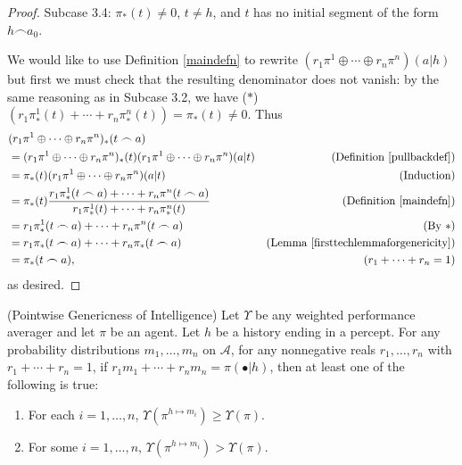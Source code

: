 \documentclass[runningheads]{llncs}
\begin{document}
\begin{proof}
    Subcase 3.4: $\pi_*(t)\not=0$, $t\not=h$, and $t$ has no initial segment
        of the form $h\frown a_0$.

    We would like to use Definition \ref{maindefn} to rewrite
    $(r_1\pi^1\oplus\cdots\oplus r_n\pi^n)(a|h)$ but first we must
    check that the resulting denominator does not vanish:
    by the same reasoning as in Subcase 3.2, we have
    ($*$) $(r_1\pi^1_*(t)+\cdots+r_n\pi^n_*(t))=\pi_*(t)\not=0$.
    Thus
    \begin{align*}
        &{} (r_1\pi^1\oplus\cdots\oplus r_n\pi^n)_*(t\frown a)\\
            &= (r_1\pi^1\oplus\cdots\oplus r_n\pi^n)_*(t)
                (r_1\pi^1\oplus\cdots\oplus r_n\pi^n)(a|t)
                    &\mbox{(Definition \ref{pullbackdef})}\\
            &= \pi_*(t)(r_1\pi^1\oplus\cdots\oplus r_n\pi^n)(a|t)
                    &\mbox{(Induction)}\\
            &= \pi_*(t)\frac{r_1\pi^1_*(t\frown a)+\cdots+r_n\pi^n(t\frown a)}
                {r_1\pi^1_*(t)+\cdots+r_n\pi^n_*(t)}
                    &\mbox{(Definition \ref{maindefn})}\\
            &= r_1\pi^1_*(t\frown a)+\cdots+r_n\pi^n(t\frown a)
                    &\mbox{(By $*$)}\\
            &= r_1\pi_*(t\frown a)+\cdots+r_n\pi_*(t\frown a)
                    &\mbox{(Lemma \ref{firsttechlemmaforgenericity})}\\
            &= \pi_*(t\frown a),
                    &\mbox{($r_1+\cdots+r_n=1$)}
    \end{align*}
    as desired.
\end{proof}

\begin{theorem}
    (Pointwise Genericness of Intelligence)
    Let $\Upsilon$ be any weighted performance averager and let
    $\pi$ be an agent.
    Let $h$ be a history ending in a percept.
    For any probability distributions $m_1,\ldots,m_n$ on $\mathcal A$,
    for any nonnegative reals $r_1,\ldots,r_n$ with $r_1+\cdots+r_n=1$,
    if $r_1m_1+\cdots+r_nm_n=\pi(\bullet|h)$,
    then at least one of the following is true:
    \begin{enumerate}
        \item For each $i=1,\ldots,n$, $\Upsilon(\pi^{h\mapsto m_i})\geq \Upsilon(\pi)$.
        \item For some $i=1,\ldots,n$, $\Upsilon(\pi^{h\mapsto m_i})>\Upsilon(\pi)$.
    \end{enumerate}
\end{theorem}
\end{document}
